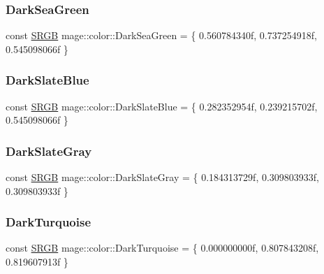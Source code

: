 \subsubsection{\texorpdfstring{Dark\+Sea\+Green}{DarkSeaGreen}}
{\footnotesize\ttfamily const \hyperlink{structmage_1_1_s_r_g_b}{S\+R\+GB} mage\+::color\+::\+Dark\+Sea\+Green = \{ 0.\+560784340f, 0.\+737254918f, 0.\+545098066f \}}

\hypertarget{namespacemage_1_1color_a0ae7c65a65ed59d6e9c460b6fff6f969}{}\label{namespacemage_1_1color_a0ae7c65a65ed59d6e9c460b6fff6f969} 
\subsubsection{\texorpdfstring{Dark\+Slate\+Blue}{DarkSlateBlue}}
{\footnotesize\ttfamily const \hyperlink{structmage_1_1_s_r_g_b}{S\+R\+GB} mage\+::color\+::\+Dark\+Slate\+Blue = \{ 0.\+282352954f, 0.\+239215702f, 0.\+545098066f \}}

\hypertarget{namespacemage_1_1color_a24d29f892ab6d1e16c503166ffcca0cc}{}\label{namespacemage_1_1color_a24d29f892ab6d1e16c503166ffcca0cc} 
\subsubsection{\texorpdfstring{Dark\+Slate\+Gray}{DarkSlateGray}}
{\footnotesize\ttfamily const \hyperlink{structmage_1_1_s_r_g_b}{S\+R\+GB} mage\+::color\+::\+Dark\+Slate\+Gray = \{ 0.\+184313729f, 0.\+309803933f, 0.\+309803933f \}}

\hypertarget{namespacemage_1_1color_a01e6056e8a522297fe4f201043297e27}{}\label{namespacemage_1_1color_a01e6056e8a522297fe4f201043297e27} 
\subsubsection{\texorpdfstring{Dark\+Turquoise}{DarkTurquoise}}
{\footnotesize\ttfamily const \hyperlink{structmage_1_1_s_r_g_b}{S\+R\+GB} mage\+::color\+::\+Dark\+Turquoise = \{ 0.\+000000000f, 0.\+807843208f, 0.\+819607913f \}}

\hypertarget{namespacemage_1_1color_addcf49bc45daf9623ce99da3113d506c}{}\label{namespacemage_1_1color_addcf49bc45daf9623ce99da3113d506c} 
